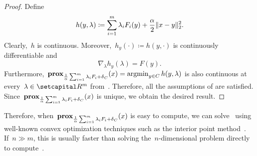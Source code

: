 \documentclass[../../main]{subfiles}
\begin{document}
\begin{proof}
    Define
    \begin{equation}
        h(y, \lambda) \coloneqq \sum_{i = 1}^{m} \lambda_i F_i(y) + \frac{\alpha}{2} \lVert x - y\rVert_2^2
    .\end{equation} 
    Clearly,~$h$ is continuous.
    Moreover,~$h_y(\cdot) \coloneqq h(y, \cdot)$ is continuously differentiable and
    \begin{equation}
        \nabla_\lambda h_y(\lambda) = F(y)
    .\end{equation} 
    Furthermore,~$\operatorname{\mathbf{prox}}_{\frac{1}{\alpha} \sum_{i = 1}^{m} \lambda_i F_i + \operatorname{\delta}_C}(x) = \operatorname*{argmin}_{y \in C} h(y, \lambda)$ is also continuous at every~$\lambda \in \setR^m$ from~\cite[Excercise 7.38]{Rockafellar1998}.
    Therefore, all the assumptions of  are satisfied.
    Since~$\operatorname{\mathbf{prox}}_{\frac{1}{\alpha} \sum_{i = 1}^{m} \lambda_i F_i + \operatorname{\delta}_C}(x)$ is unique, we obtain the desired result.
\end{proof}
Therefore, when~$\operatorname{\mathbf{prox}}_{\frac{1}{\alpha} \sum_{i = 1}^{m} \lambda_i F_i + \operatorname{\delta}_C}(x)$ is easy to compute, we can solve~ using well-known convex optimization techniques such as the interior point method~\cite{Bertsekas1999}.
If~$n \gg m$, this is usually faster than solving the~$n$-dimensional problem directly to compute~.
\end{document}
